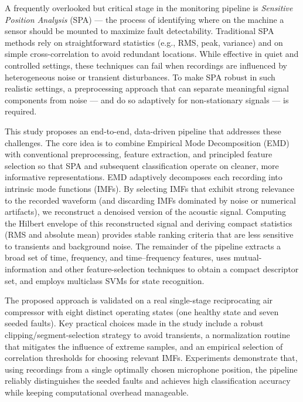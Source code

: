 \documentclass[12pt,a4paper]{article}
\begin{document}
\begin{multicols}{2}
A frequently overlooked but critical stage in the monitoring pipeline is \emph{Sensitive Position Analysis} (SPA) — the process of identifying where on the machine a sensor should be mounted to maximize fault detectability. Traditional SPA methods rely on straightforward statistics (e.g., RMS, peak, variance) and on simple cross-correlation to avoid redundant locations. While effective in quiet and controlled settings, these techniques can fail when recordings are influenced by heterogeneous noise or transient disturbances. To make SPA robust in such realistic settings, a preprocessing approach that can separate meaningful signal components from noise — and do so adaptively for non-stationary signals — is required.

This study proposes an end-to-end, data-driven pipeline that addresses these challenges. The core idea is to combine Empirical Mode Decomposition (EMD) with conventional preprocessing, feature extraction, and principled feature selection so that SPA and subsequent classification operate on cleaner, more informative representations. EMD adaptively decomposes each recording into intrinsic mode functions (IMFs). By selecting IMFs that exhibit strong relevance to the recorded waveform (and discarding IMFs dominated by noise or numerical artifacts), we reconstruct a denoised version of the acoustic signal. Computing the Hilbert envelope of this reconstructed signal and deriving compact statistics (RMS and absolute mean) provides stable ranking criteria that are less sensitive to transients and background noise. The remainder of the pipeline extracts a broad set of time, frequency, and time–frequency features, uses mutual-information and other feature-selection techniques to obtain a compact descriptor set, and employs multiclass SVMs for state recognition.

The proposed approach is validated on a real single-stage reciprocating air compressor with eight distinct operating states (one healthy state and seven seeded faults). Key practical choices made in the study include a robust clipping/segment-selection strategy to avoid transients, a normalization routine that mitigates the influence of extreme samples, and an empirical selection of correlation thresholds for choosing relevant IMFs. Experiments demonstrate that, using recordings from a single optimally chosen microphone position, the pipeline reliably distinguishes the seeded faults and achieves high classification accuracy while keeping computational overhead manageable.


\end{multicols}
\end{document}
